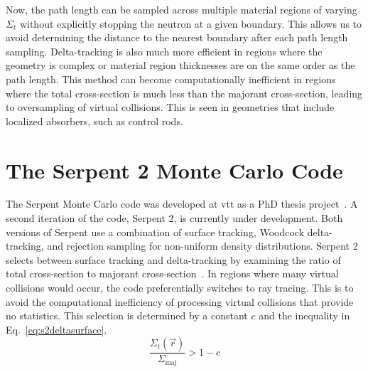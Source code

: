 Now, the path length can be sampled across multiple material regions
of varying $\Sigma_t$ without explicitly stopping the neutron at a
given boundary. This allows us to avoid determining the distance to
the nearest boundary after each path length sampling. Delta-tracking
is also much more efficient in regions where the geometry is complex
or material region thicknesses are on the same order as the path
length. %
This method can become computationally inefficient in
regions where the total cross-section is much less than the majorant
cross-section, leading to oversampling of virtual collisions. This is
seen in geometries that include localized absorbers, such as control
rods.

%

\section{The Serpent 2 Monte Carlo Code}
\label{sec:serpent2}

The Serpent Monte Carlo code was developed at \gls{vtt} as a PhD
thesis project~\cite{leppanen2007}. A second iteration of the code,
Serpent 2, is currently under development. Both versions of Serpent use a combination of surface tracking, Woodcock
delta-tracking, and rejection sampling for non-uniform density
distributions. Serpent 2 selects between surface tracking and
delta-tracking by examining the ratio of total cross-section to
majorant cross-section~\cite{leppanen2010}. In regions where many
virtual collisions would occur, the code preferentially switches to
ray tracing. This is to avoid the computational inefficiency of
processing virtual collisions that provide no statistics. This
selection is determined by a constant $c$ and the inequality in
Eq.~\eqref{eq:s2deltasurface}.
\begin{equation}
  \label{eq:s2deltasurface}
  \frac{\Sigma_t(\vec{r})}{\Sigma_\mathrm{maj}} > 1 - c
\end{equation}

